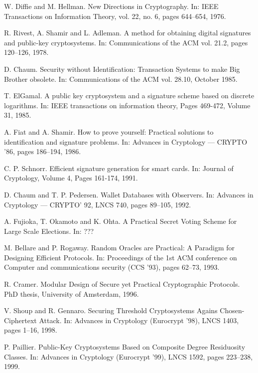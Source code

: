 \documentclass[envcountsame]{llncs}
\begin{document}
\begin{thebibliography}{XXX11}

W. Diffie and M. Hellman.
New Directions in Cryptography.
In: IEEE Transactions on Information Theory, vol. 22, no. 6, pages 644--654, 1976.

R. Rivest, A. Shamir and L. Adleman.
A method for obtaining digital signatures and public-key cryptosystems.
In: Communications of the ACM vol. 21.2, pages 120--126, 1978.

D. Chaum.
Security without Identification: Transaction Systems to make Big Brother obsolete.
In: Communications of the ACM vol. 28.10, October 1985.

T. ElGamal.
A public key cryptosystem and a signature scheme based on discrete logarithms.
In: IEEE transactions on information theory, Pages 469-472, Volume 31, 1985.

A. Fiat and A. Shamir.
How to prove yourself: Practical solutions to identification and signature problems.
In: Advances in Cryptology --- CRYPTO '86, pages 186--194, 1986.

C. P. Schnorr.
Efficient signature generation for smart cards.
In: Journal of Cryptology, Volume 4, Pages 161-174, 1991.

D. Chaum and T. P. Pedersen.
Wallet Databases with Observers.
In: Advances in Cryptology --- CRYPTO' 92, LNCS 740, pages 89--105, 1992.

A. Fujioka, T. Okamoto and K. Ohta.
A Practical Secret Voting Scheme for Large Scale Elections.
In: ???

M. Bellare and P. Rogaway.
Random Oracles are Practical: A Paradigm for Designing Efficient Protocols.
In: Proceedings of the 1st ACM conference on Computer and communications security (CCS '93), pages 62--73, 1993.

R. Cramer.
Modular Design of Secure yet Practical Cryptographic Protocols.
PhD thesis, University of Amsterdam, 1996.

V. Shoup and R. Gennaro.
Securing Threshold Cryptosystems Agains Chosen-Ciphertext Attack.
In: Advances in Cryptology (Eurocrypt '98), LNCS 1403, pages 1--16, 1998.

P. Paillier.
Public-Key Cryptosystems Based on Composite Degree Residuosity Classes.
In: Advances in Cryptology (Eurocrypt '99), LNCS 1592, pages
223--238, 1999.


\end{thebibliography}
\end{document}
